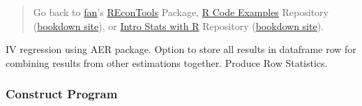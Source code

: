 \documentclass[
]{book}
\begin{document}
\begin{quote}
Go back to \href{http://fanwangecon.github.io/}{fan}'s \href{https://fanwangecon.github.io/REconTools/}{REconTools} Package, \href{https://fanwangecon.github.io/R4Econ/}{R Code Examples} Repository (\href{https://fanwangecon.github.io/R4Econ/bookdown}{bookdown site}), or \href{https://fanwangecon.github.io/Stat4Econ/}{Intro Stats with R} Repository (\href{https://fanwangecon.github.io/Stat4Econ/bookdown}{bookdown site}).
\end{quote}

IV regression using AER package. Option to store all results in dataframe row for combining results from other estimations together. Produce Row Statistics.

\hypertarget{construct-program}{%
\subsubsection{Construct Program}\label{construct-program}}
\end{document}
